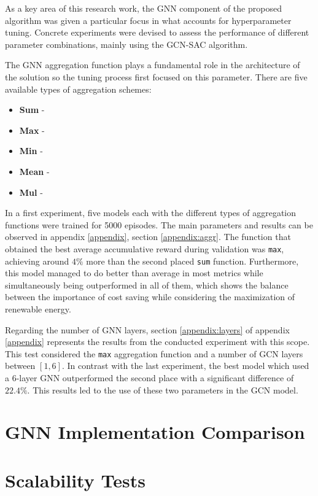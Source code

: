 As a key area of this research work, the \ac{GNN} component of the proposed algorithm was given a particular focus in what accounts for hyperparameter tuning. Concrete experiments were devised to assess the performance of different parameter combinations, mainly using the GCN-SAC algorithm. \par

The \ac{GNN} aggregation function plays a fundamental role in the architecture of the solution so the tuning process first focused on this parameter. There are five available types of aggregation schemes:
\begin{itemize}
\item \textbf{Sum} - 
\item \textbf{Max} -
\item \textbf{Min} - 
\item \textbf{Mean} - 
\item \textbf{Mul} - 
\end{itemize}

In a first experiment, five models each with the different types of aggregation functions were trained for 5000 episodes. The main parameters and results can be observed in appendix \ref{appendix}, section \ref{appendix:aggr}. The function that obtained the best average accumulative reward during validation was \texttt{max}, achieving around $4\%$ more than the second placed \texttt{sum} function. Furthermore, this model managed to do better than average in most metrics while simultaneously being outperformed in all of them, which shows the balance between the importance of cost saving while considering the maximization of renewable energy. \par

Regarding the number of \ac{GNN} layers, section \ref{appendix:layers} of appendix \ref{appendix} represents the results from the conducted experiment with this scope. This test considered the \texttt{max} aggregation function and a number of \ac{GCN} layers between $[1,6]$. In contrast with the last experiment, the best model which used a 6-layer \ac{GNN} outperformed the second place with a significant difference of $22.4\%$. This results led to the use of these two parameters in the \ac{GCN} model.




\section{GNN Implementation Comparison} \label{sec:gnn-comparison}

\section{Scalability Tests} \label{sec:scalability-tests}

